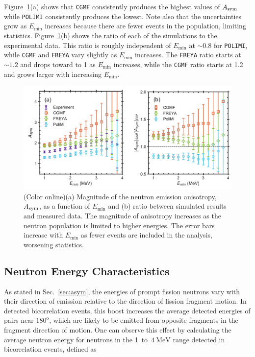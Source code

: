 \documentclass[preprint,12pt]{elsarticle}
\newcommand{\figfirst}[1]  {Figure~\ref{#1}}
\newcommand{\secref}[1]  {Sec.~\ref{#1}}
\newcommand{\cgmf}            {\texttt{CGMF}\xspace}
\newcommand{\freya}           {\texttt{FREYA}\xspace}
\newcommand{\polimi}          {\texttt{POLIMI}\xspace}
\newcommand{\coloronline}     {(Color online)\xspace}
\newcommand{\Emin}{\ensuremath{E_{\textrm{min}}}\xspace}
\newcommand{\Asym}           {\ensuremath{A_{\rm{sym}}}\xspace}
\newcommand{\genunit}[2]{\ensuremath{#1~\text{#2}}\xspace}
\newcommand{\MeV}[1]    {\genunit{#1}{MeV}}
\newcommand{\degrees}[1]{\ensuremath{#1^{\mathrm{o}}}\xspace}
\begin{document}
\figfirst{fig:Asym_vs_Emin}(a) shows that \cgmf consistently produces the highest values of \Asym while \polimi consistently produces the lowest.  Note also that the uncertainties grow as \Emin increases because there are fewer events in the population, limiting statistics. \figfirst{fig:Asym_vs_Emin}(b) shows the ratio of each of the simulations to the experimental data. This ratio is roughly independent of $\Emin$ at $\sim0.8$ for \polimi, while \cgmf and \freya vary slightly as \Emin increases. The \freya ratio starts at $\sim1.2$ and drops toward to 1 as \Emin increases, while the \cgmf ratio starts at 1.2 and grows larger with increasing \Emin.

\begin{figure}[!t]
	\centering
	\includegraphics[trim={0cm 0cm 0cm 0cm},clip,width=7in]{Asym_figs.png}
	\caption{\coloronline (a) Magnitude of the neutron emission anisotropy, \Asym, as a function of \Emin and (b) ratio between simulated results and measured data. The magnitude of anisotropy increases as the neutron population is limited to higher energies. The error bars increase with \Emin as fewer events are included in the analysis, worsening statistics.}
	\label{fig:Asym_vs_Emin}
\end{figure}

\subsection{Neutron Energy Characteristics}

As stated in \secref{sec:asym}, the energies of prompt fission neutrons vary with their direction of emission relative to the direction of fission fragment motion. In detected bicorrelation events, this boost increases the average detected energies of pairs near \degrees{180}, which are likely to be emitted from opposite fragments in the fragment direction of motion. One can observe this effect by calculating the average neutron energy for neutrons in the 1~to~\MeV{4} range detected in bicorrelation events, defined as
\end{document}
